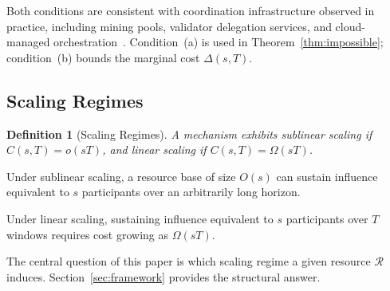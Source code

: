 \documentclass[manuscript,review]{acmart}
\newtheorem{definition}[theorem]{Definition}
\theoremstyle{remark}
\begin{document}
	Both conditions are consistent with coordination
	infrastructure observed in practice, including mining
	pools, validator delegation services, and cloud-managed
	orchestration~\cite{rosenfeld2011analysis,
		bonneau2015sok,saleh2021blockchain}.
	Condition~(a) is used in Theorem~\ref{thm:impossible};
	condition~(b) bounds the marginal cost $\Delta(s,T)$.
	
	\subsection{Scaling Regimes}
	\label{ssec:regimes}
	
	\begin{definition}[Scaling Regimes]
		\label{def:regimes}
		A mechanism exhibits \emph{sublinear scaling} if
		$C(s, T) = o(sT)$, and \emph{linear scaling} if
		$C(s, T) = \Omega(sT)$.
	\end{definition}
	
	Under sublinear scaling, a resource base of size
	$O(s)$ can sustain influence equivalent to $s$
	participants over an arbitrarily long horizon.
	
	Under linear scaling, sustaining influence equivalent
	to $s$ participants over $T$ windows requires cost
	growing as $\Omega(sT)$.
	
	The central question of this paper is which scaling
	regime a given resource $\mathcal{R}$ induces.
	Section~\ref{sec:framework} provides the structural
	answer.
	
\end{document}
